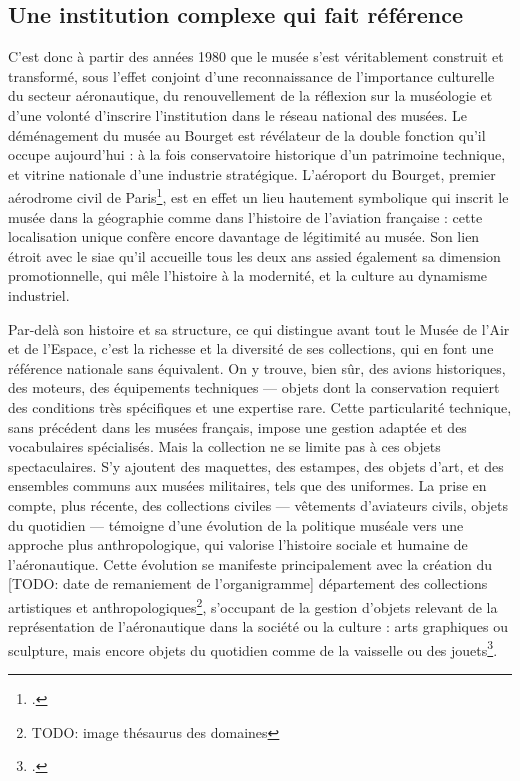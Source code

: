 \subsection{Une institution complexe qui fait référence}
C’est donc à partir des années 1980 que le musée s’est véritablement construit et transformé, sous l’effet conjoint d’une reconnaissance de l’importance culturelle du secteur aéronautique, du renouvellement de la réflexion sur la muséologie et d’une volonté d'inscrire l'institution dans le réseau national des musées. Le déménagement du musée au Bourget est révélateur de la double fonction qu’il occupe aujourd’hui : à la fois conservatoire historique d’un patrimoine technique, et vitrine nationale d’une industrie stratégique. L’aéroport du Bourget, premier aérodrome civil de Paris\footcite{terrier_eroport_2019}, est en effet un lieu hautement symbolique qui inscrit le musée dans la géographie comme dans l'histoire de l'aviation française : cette localisation unique confère encore davantage de légitimité au musée. Son lien étroit avec le \ac{siae} qu'il accueille tous les deux ans assied également sa dimension promotionnelle, qui mêle l’histoire à la modernité, et la culture au dynamisme industriel.

Par-delà son histoire et sa structure, ce qui distingue avant tout le Musée de l’Air et de l’Espace, c’est la richesse et la diversité de ses collections, qui en font une référence nationale sans équivalent. On y trouve, bien sûr, des avions historiques, des moteurs, des équipements techniques — objets dont la conservation requiert des conditions très spécifiques et une expertise rare. Cette particularité technique, sans précédent dans les musées français, impose une gestion adaptée et des vocabulaires spécialisés. Mais la collection ne se limite pas à ces objets spectaculaires. S’y ajoutent des maquettes, des estampes, des objets d’art, et des ensembles communs aux musées militaires, tels que des uniformes. La prise en compte, plus récente, des collections civiles — vêtements d’aviateurs civils, objets du quotidien — témoigne d’une évolution de la politique muséale vers une approche plus anthropologique, qui valorise l’histoire sociale et humaine de l’aéronautique. Cette évolution se manifeste principalement avec la création du [TODO: date de remaniement de l'organigramme] département des collections artistiques et anthropologiques\footnote{TODO: image thésaurus des domaines}, s'occupant de la gestion d'objets relevant de la représentation de l'aéronautique dans la société ou la culture : arts graphiques ou sculpture, mais encore objets du quotidien comme de la vaisselle ou des jouets\footcite{collectif_musee_2023}.

